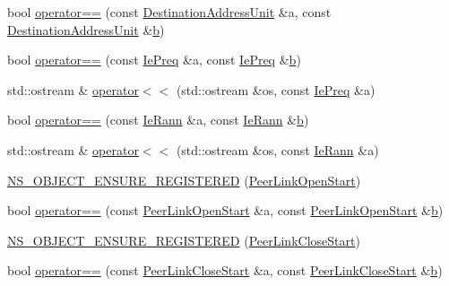 \begin{DoxyCompactItemize}
\item 
bool \hyperlink{namespacens3_1_1dot11s_a136414d52b2511da5e24c811cc8ded62}{operator==} (const \hyperlink{classns3_1_1dot11s_1_1DestinationAddressUnit}{Destination\+Address\+Unit} \&a, const \hyperlink{classns3_1_1dot11s_1_1DestinationAddressUnit}{Destination\+Address\+Unit} \&\hyperlink{lte__pathloss_8m_a21ad0bd836b90d08f4cf640b4c298e7c}{b})
\item 
bool \hyperlink{namespacens3_1_1dot11s_abd1a7ef48675b476f64073fd1555d277}{operator==} (const \hyperlink{classns3_1_1dot11s_1_1IePreq}{Ie\+Preq} \&a, const \hyperlink{classns3_1_1dot11s_1_1IePreq}{Ie\+Preq} \&\hyperlink{lte__pathloss_8m_a21ad0bd836b90d08f4cf640b4c298e7c}{b})
\item 
std\+::ostream \& \hyperlink{namespacens3_1_1dot11s_a538df889b845ab6e5b2cd9d61a45f33d}{operator$<$$<$} (std\+::ostream \&os, const \hyperlink{classns3_1_1dot11s_1_1IePreq}{Ie\+Preq} \&a)
\item 
bool \hyperlink{namespacens3_1_1dot11s_aa1e9174cea8c71e08b32545c8446fe8a}{operator==} (const \hyperlink{classns3_1_1dot11s_1_1IeRann}{Ie\+Rann} \&a, const \hyperlink{classns3_1_1dot11s_1_1IeRann}{Ie\+Rann} \&\hyperlink{lte__pathloss_8m_a21ad0bd836b90d08f4cf640b4c298e7c}{b})
\item 
std\+::ostream \& \hyperlink{namespacens3_1_1dot11s_ab3f0282bfa1e20f94cf62dde642817df}{operator$<$$<$} (std\+::ostream \&os, const \hyperlink{classns3_1_1dot11s_1_1IeRann}{Ie\+Rann} \&a)
\item 
\hyperlink{namespacens3_1_1dot11s_a03b06db2978c756962e4aa494b0a94d0}{N\+S\+\_\+\+O\+B\+J\+E\+C\+T\+\_\+\+E\+N\+S\+U\+R\+E\+\_\+\+R\+E\+G\+I\+S\+T\+E\+R\+ED} (\hyperlink{classns3_1_1dot11s_1_1PeerLinkOpenStart}{Peer\+Link\+Open\+Start})
\item 
bool \hyperlink{namespacens3_1_1dot11s_a1ef39ad02f14bc3415c983b762c6ebd9}{operator==} (const \hyperlink{classns3_1_1dot11s_1_1PeerLinkOpenStart}{Peer\+Link\+Open\+Start} \&a, const \hyperlink{classns3_1_1dot11s_1_1PeerLinkOpenStart}{Peer\+Link\+Open\+Start} \&\hyperlink{lte__pathloss_8m_a21ad0bd836b90d08f4cf640b4c298e7c}{b})
\item 
\hyperlink{namespacens3_1_1dot11s_ae0009bcacd10364dec76e6e45e69f7a4}{N\+S\+\_\+\+O\+B\+J\+E\+C\+T\+\_\+\+E\+N\+S\+U\+R\+E\+\_\+\+R\+E\+G\+I\+S\+T\+E\+R\+ED} (\hyperlink{classns3_1_1dot11s_1_1PeerLinkCloseStart}{Peer\+Link\+Close\+Start})
\item 
bool \hyperlink{namespacens3_1_1dot11s_a7f5c687d0aa8e9e2135c5f0790cacb82}{operator==} (const \hyperlink{classns3_1_1dot11s_1_1PeerLinkCloseStart}{Peer\+Link\+Close\+Start} \&a, const \hyperlink{classns3_1_1dot11s_1_1PeerLinkCloseStart}{Peer\+Link\+Close\+Start} \&\hyperlink{lte__pathloss_8m_a21ad0bd836b90d08f4cf640b4c298e7c}{b})

\end{DoxyCompactItemize}
